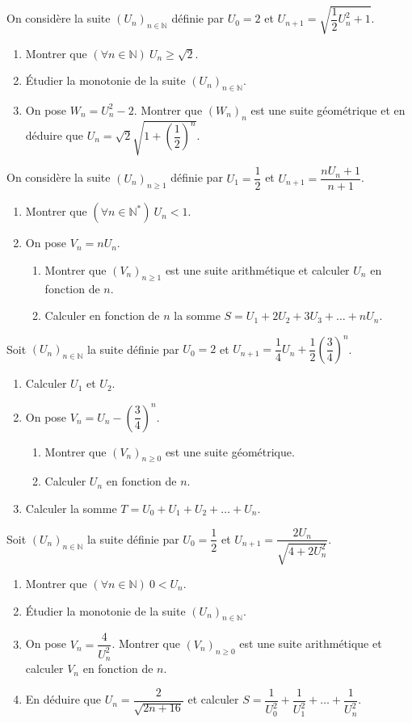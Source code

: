 On considère la suite $(U_n)_{n\in\mathbb{N}}$ définie par $U_0=2$ et $U_{n+1}=\sqrt{\dfrac12U_n^2+1}$.
\begin{enumerate}
\item Montrer que $(\forall n\in\mathbb{N})\ U_n\geq\sqrt2$.
\item Étudier la monotonie de la suite $(U_n)_{n\in\mathbb{N}}$.
\item On pose $W_n=U_n^2-2$. Montrer que $(W_n)_n$ est une suite géométrique et en déduire que $U_n=\sqrt2\sqrt{1+\left(\dfrac12\right)^n}$.
\end{enumerate}
\fin
{}
On considère la suite $(U_n)_{n\geq1}$ définie par $U_1=\dfrac12$ et $U_{n+1}=\dfrac{nU_n+1}{n+1}$.
\begin{enumerate}
\item Montrer que $(\forall n\in\mathbb{N}^*)\ U_n<1$.
\item On pose $V_n=nU_n$.
\begin{enumerate}
\item Montrer que $(V_n)_{n\geq1}$ est une suite arithmétique et calculer $U_n$ en fonction de $n$.
\item Calculer en fonction de $n$ la somme $S=U_1+2U_2+3U_3+\dots+nU_n$.
\end{enumerate}
\end{enumerate}
\fin
{}
Soit $(U_n)_{n\in\mathbb{N}}$ la suite définie par $U_0=2$ et $U_{n+1}=\dfrac14U_n+\dfrac12\left(\dfrac34\right)^n$.
\begin{enumerate}
\item Calculer $U_1$ et $U_2$.
\item On pose $V_n=U_n-\left(\dfrac34\right)^n$.
\begin{enumerate}
\item Montrer que $(V_n)_{n\geq0}$ est une suite géométrique.
\item Calculer $U_n$ en fonction de $n$.
\end{enumerate}
\item Calculer la somme $T=U_0+U_1+U_2+\dots+U_n$.
\end{enumerate}
\fin
{}
Soit $(U_n)_{n\in\mathbb{N}}$ la suite définie par $U_0=\dfrac12$ et $U_{n+1}=\dfrac{2U_n}{\sqrt{4+2U_n^2}}$.
\begin{enumerate}
\item Montrer que $(\forall n\in\mathbb{N})\ 0<U_n$.
\item Étudier la monotonie de la suite $(U_n)_{n\in\mathbb{N}}$.
\item On pose $V_n=\dfrac{4}{U_n^2}$. Montrer que $(V_n)_{n\geq0}$ est une suite arithmétique et calculer $V_n$ en fonction de $n$.
\item En déduire que $U_n=\dfrac{2}{\sqrt{2n+16}}$ et calculer $S=\dfrac{1}{U_0^2}+\dfrac{1}{U_1^2}+\dots+\dfrac{1}{U_n^2}$.
\end{enumerate}
